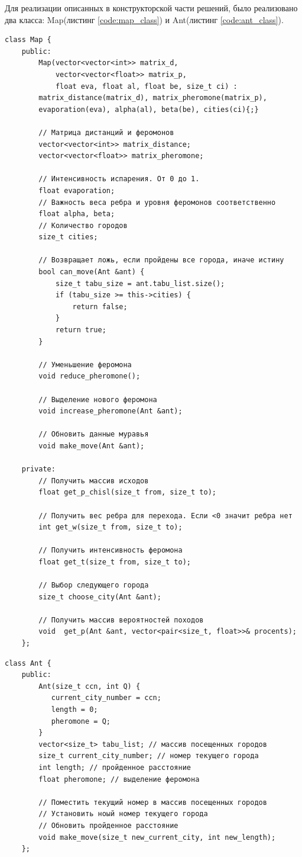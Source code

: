 \documentclass[a4paper, 14pt]{article}
\begin{document}
	Для реализации описанных в конструкторской части решений, было реализовано два класса: Map(листинг \ref{code:map_class}) и Ant(листинг  \ref{code:ant_class}).
		\begin{lstlisting}[label=code:map_class,caption=Класс Map]
    class Map {
    public:
        Map(vector<vector<int>> matrix_d,
            vector<vector<float>> matrix_p,
            float eva, float al, float be, size_t ci) :
        matrix_distance(matrix_d), matrix_pheromone(matrix_p),
        evaporation(eva), alpha(al), beta(be), cities(ci){;}
    
        // Матрица дистанций и феромонов
        vector<vector<int>> matrix_distance;
        vector<vector<float>> matrix_pheromone;
    
        // Интенсивность испарения. От 0 до 1.
        float evaporation;
        // Важность веса ребра и уровня феромонов соответственно
        float alpha, beta;
        // Количество городов
        size_t cities;
    
        // Возвращает ложь, если пройдены все города, иначе истину
        bool can_move(Ant &ant) {
            size_t tabu_size = ant.tabu_list.size();
            if (tabu_size >= this->cities) {
                return false;
            }
            return true;
        }
    
        // Уменьшение феромона
        void reduce_pheromone();
    
        // Выделение нового феромона
        void increase_pheromone(Ant &ant);
    
        // Обновить данные муравья
        void make_move(Ant &ant);
    
    private:
        // Получить массив исходов
        float get_p_chisl(size_t from, size_t to);
    
        // Получить вес ребра для перехода. Если <0 значит ребра нет
        int get_w(size_t from, size_t to);
    
        // Получить интенсивность феромона
        float get_t(size_t from, size_t to);
    
        // Выбор следующего города
        size_t choose_city(Ant &ant);
    
        // Получить массив вероятностей походов
        void  get_p(Ant &ant, vector<pair<size_t, float>>& procents);
    };
	\end{lstlisting}
	
		\begin{lstlisting}[label=code:ant_class,caption=Класс Ant]
    class Ant {
    public:
        Ant(size_t ccn, int Q) {
           current_city_number = ccn;
           length = 0;
           pheromone = Q;
        }
        vector<size_t> tabu_list; // массив посещенных городов
        size_t current_city_number; // номер текущего города
        int length; // пройденное расстояние
        float pheromone; // выделение феромона
    
        // Поместить текущий номер в массив посещенных городов
        // Установить ноый номер текущего города
        // Обновить пройденное расстояние
        void make_move(size_t new_current_city, int new_length);
    };
	\end{lstlisting}
	
\end{document}

